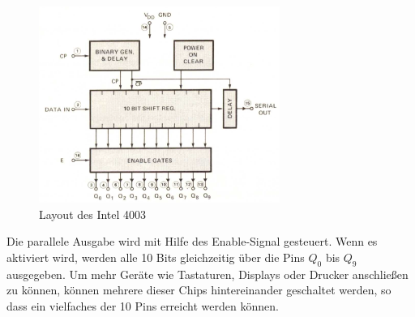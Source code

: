  \begin{figure}[H]
 	\centering
 	\includegraphics[width=0.7\textwidth]{figures/layout_4003.png}
 	\caption{Layout des Intel 4003}
 	\label{fig:layout_4003}
 \end{figure}
 
Die parallele Ausgabe wird mit Hilfe des Enable-Signal gesteuert. 
Wenn es aktiviert wird, werden alle 10 Bits gleichzeitig über die Pins $Q_0$ bis $Q_9$ ausgegeben. Um mehr Geräte wie Tastaturen, Displays oder Drucker anschließen zu können, können mehrere dieser Chips hintereinander geschaltet werden, so dass ein vielfaches der 10 Pins erreicht werden können.

